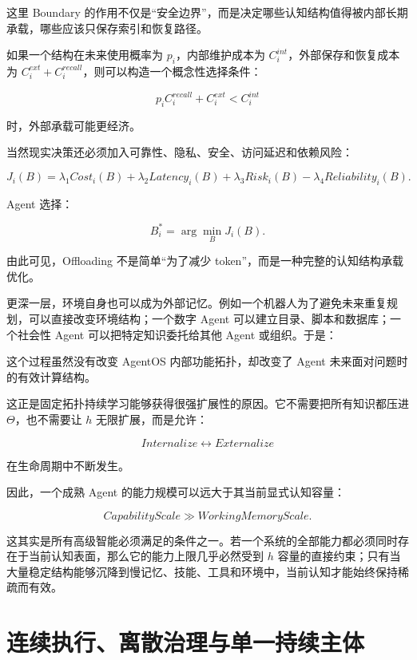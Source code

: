 这里 Boundary 的作用不仅是“安全边界”，而是决定哪些认知结构值得被内部长期承载，哪些应该只保存索引和恢复路径。

如果一个结构在未来使用概率为 $p_i$，内部维护成本为 $C_i^{int}$，外部保存和恢复成本为 $C_i^{ext}+C_i^{recall}$，则可以构造一个概念性选择条件：

\[
p_iC_i^{recall}
+
C_i^{ext}
<
C_i^{int}
\]

时，外部承载可能更经济。

当然现实决策还必须加入可靠性、隐私、安全、访问延迟和依赖风险：

\[
J_i(B)
=
\lambda_1 Cost_i(B)
+
\lambda_2 Latency_i(B)
+
\lambda_3 Risk_i(B)
-
\lambda_4 Reliability_i(B).
\]

Agent 选择：

\[
B_i^*
=
\arg\min_B J_i(B).
\]

由此可见，Offloading 不是简单“为了减少 token”，而是一种完整的认知结构承载优化。

更深一层，环境自身也可以成为外部记忆。例如一个机器人为了避免未来重复规划，可以直接改变环境结构；一个数字 Agent 可以建立目录、脚本和数据库；一个社会性 Agent 可以把特定知识委托给其他 Agent 或组织。于是：

\begin{statementbox}
\centering
{}
\end{statementbox}

这个过程虽然没有改变 AgentOS 内部功能拓扑，却改变了 Agent 未来面对问题时的有效计算结构。

这正是固定拓扑持续学习能够获得很强扩展性的原因。它不需要把所有知识都压进 $\Theta$，也不需要让 $h$ 无限扩展，而是允许：

\[
Internalize
\leftrightarrow
Externalize
\]

在生命周期中不断发生。

因此，一个成熟 Agent 的能力规模可以远大于其当前显式认知容量：

\[
\boxed{
CapabilityScale
\gg
WorkingMemoryScale.
}
\]

这其实是所有高级智能必须满足的条件之一。若一个系统的全部能力都必须同时存在于当前认知表面，那么它的能力上限几乎必然受到 $h$ 容量的直接约束；只有当大量稳定结构能够沉降到慢记忆、技能、工具和环境中，当前认知才能始终保持稀疏而有效。

\section{连续执行、离散治理与单一持续主体}

